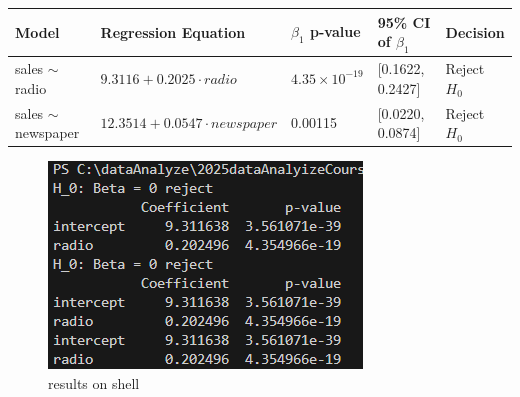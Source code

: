 \documentclass{article}
\begin{document}
\begin{table}[h!]
\centering
\begin{tabular}{@{}lllll@{}}
\toprule
Model & Regression Equation & $\beta_1$ p-value & 95\% CI of $\beta_1$ & Decision \\ \midrule
sales $\sim$ radio & $9.3116 + 0.2025 \cdot radio$ & $4.35 \times 10^{-19}$ & [0.1622, 0.2427] & Reject $H_0$ \\
sales $\sim$ newspaper & $12.3514 + 0.0547 \cdot newspaper$ & 0.00115 & [0.0220, 0.0874] & Reject $H_0$ \\
\bottomrule
\end{tabular}
\end{table}
\begin{figure}
    \centering
    \includegraphics[width=0.5\linewidth]{Homework2_result.png}
    \caption{results on shell}
    \label{fig:placeholder}
\end{figure}
\end{document}
